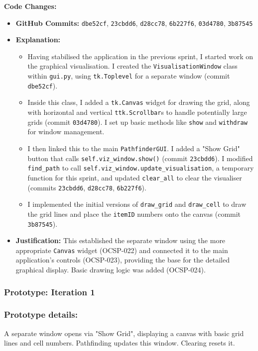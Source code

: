 \textbf{Code Changes:}
\begin{itemize}
	\item \textbf{GitHub Commits:} \verb|dbe52cf|, \verb|23cbdd6|, \verb|d28cc78|, \verb|6b227f6|, \verb|03d4780|, \verb|3b87545|
	\item \textbf{Explanation:}
	\begin{itemize}
		\item Having stabilised the application in the previous sprint, I started work on the graphical visualisation. I created the \verb|VisualisationWindow| class within \verb|gui.py|, using \verb|tk.Toplevel| for a separate window (commit \verb|dbe52cf|).
		\item Inside this class, I added a \verb|tk.Canvas| widget for drawing the grid, along with horizontal and vertical \verb|ttk.Scrollbar|s to handle potentially large grids (commit \verb|03d4780|). I set up basic methods like \verb|show| and \verb|withdraw| for window management.
		\item I then linked this to the main \verb|PathfinderGUI|. I added a "Show Grid" button that calls \verb|self.viz_window.show()| (commit \verb|23cbdd6|). I modified \verb|find_path| to call \verb|self.viz_window.update_visualisation|, a temporary function for this sprint, and updated \verb|clear_all| to clear the visualiser (commits \verb|23cbdd6|, \verb|d28cc78|, \verb|6b227f6|).
		\item I implemented the initial versions of \verb|draw_grid| and \verb|draw_cell| to draw the grid lines and place the \verb|itemID| numbers onto the canvas (commit \verb|3b87545|).
	\end{itemize}
	\item \textbf{Justification:} This established the separate window using the more appropriate \verb|Canvas| widget (OCSP-022) and connected it to the main application's controls (OCSP-023), providing the base for the detailed graphical display. Basic drawing logic was added (OCSP-024).
\end{itemize}


\subsubsection*{Prototype: Iteration 1}




\subsubsection{Prototype details:}
 A separate window opens via "Show Grid", displaying a canvas with basic grid lines and cell numbers. Pathfinding updates this window. Clearing resets it.

